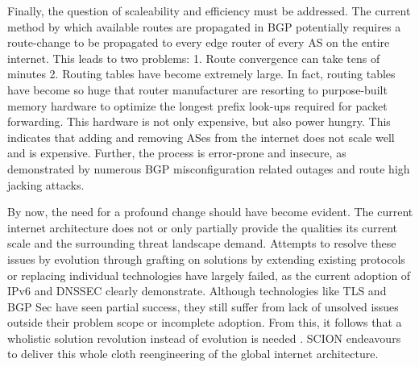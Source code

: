 \documentclass[../eva1_scion.tex]{subfiles}
\begin{document}
    Finally, the question of scaleability and efficiency must be addressed. The current method by which available routes are propagated in BGP potentially requires a route-change to be propagated to every edge router of every AS on the entire internet. This leads to two problems: 1. Route convergence can take tens of minutes \cite{route_convergence} 2. Routing tables have become extremely large. In fact, routing tables have become so huge that router manufacturer are resorting to purpose-built memory hardware to optimize the longest prefix look-ups required for packet forwarding. This hardware is not only expensive, but also power hungry. This indicates that adding and removing ASes from the internet does not scale well and is expensive. Further, the process is error-prone and insecure, as demonstrated by numerous BGP misconfiguration related outages and route high jacking attacks.

    By now, the need for a profound change should have become evident. The current internet architecture does not or only partially provide the qualities its current scale and the surrounding threat landscape demand. Attempts to resolve these issues by evolution through grafting on solutions by extending existing protocols or replacing individual technologies have largely failed, as the current adoption of IPv6 and DNSSEC clearly demonstrate. Although technologies like TLS and BGP Sec have seen partial success, they still suffer from lack of unsolved issues outside their problem scope or incomplete adoption. From this, it follows that a wholistic solution \textemdash revolution instead of evolution \textemdash is needed \cite{xkcd_927}. SCION endeavours to deliver this whole cloth reengineering of the global internet architecture.
\end{document}
